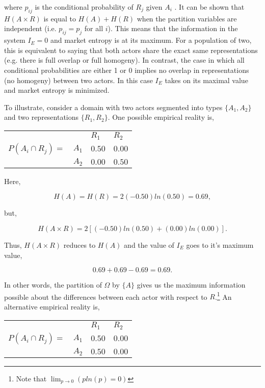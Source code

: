 \noindent where $p_{ij}$ is the conditional probability of $R_j$ given $A_i$ \citep{greeno1970}. It can be shown that $H(A \times R)$ is equal to $H(A) + H(R)$ when the partition variables are independent (i.e. $p_{ij} = p_j$ for all $i$). This means that the information in the system $I_E = 0$ and market entropy is at its maximum. For a population of two, this is equivalent to saying that both actors share the exact same representations (e.g. there is full overlap or full homogeny). In contrast, the case in which all conditional probabilities are either 1 or 0 implies no overlap in representations (no homogeny) between two actors. In this case $I_E$ takes on its maximal value and market entropy is minimized.
 
To illustrate, consider a domain with two actors segmented into types $\{A_1, A_2\}$ and two representations $\{R_1, R_2\}$.  One possible empirical reality is,

\begin{center}
\begin{tabular}{ l l l l}
& & $R_1$ & $R_2$ \\
$P(A_i \cap R_j)=$ & $A_1$ & $0.50$ & $0.00$ \\
 & $A_2$ & $0.00$ & $0.50$
\end{tabular}
\end{center}

\noindent Here, 

\begin{equation}
\nonumber H(A) = H(R) = 2(-0.50)ln(0.50) = 0.69,
\end{equation}

\noindent but,

\begin{equation}
\nonumber H(A \times R) = 2[(-0.50)ln(0.50) + (0.00)ln(0.00)].
\end{equation}

Thus, $H(A \times R)$ reduces to $H(A)$ and the value of $I_E$ goes to it's maximum value,

\begin{equation}
\nonumber 0.69 + 0.69 - 0.69 = 0.69.
\end{equation}

In other words, the partition of $\Omega$ by $\{A\}$ gives us the maximum information possible about the differences between each actor with respect to $R$.\footnote{Note that $\lim_{p \to 0}(pln(p)=0)$} An alternative empirical reality is, 

\begin{center}
\begin{tabular}{ l l l l}
& & $R_1$ & $R_2$ \\
$P(A_i \cap R_j)=$ & $A_1$ & $0.50$ & $0.00$ \\
 & $A_2$ & $0.50$ & $0.00$
\end{tabular}
\end{center}

